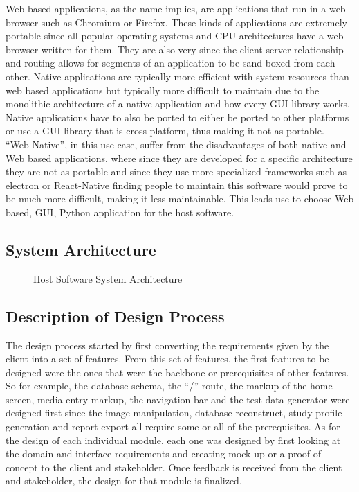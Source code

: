 \documentclass[12pt]{article}
\begin{document}
Web based applications, as the name implies, are applications that run in a web browser such as Chromium or Firefox. These kinds of applications are extremely portable since all popular operating systems and CPU architectures have a web browser written for them. They are also very since the client-server relationship and routing allows for segments of an application to be sand-boxed from each other. Native applications are typically more efficient with system resources than web based applications but typically more difficult to maintain due to the monolithic architecture of a native application and how every GUI library works. Native applications have to also be ported to either be ported to other platforms or use a GUI library that is cross platform, thus making it not as portable. ``Web-Native'', in this use case, suffer from the disadvantages of both native and Web based applications, where since they are developed for a specific architecture they are not as portable and since they use more specialized frameworks such as electron or React-Native finding people to maintain this software would prove to be much more difficult, making it less maintainable. This leads use to choose Web based, GUI, Python application for the host software.\\
\subsection{System Architecture}
\begin{figure}[H]
	\caption{Host Software System Architecture}
\end{figure}
\subsection{Description of Design Process}
The design process started by first converting the requirements given by the client into a set of features. From this set of features, the first features to be designed were the ones that were the backbone or prerequisites of other features. So for example, the database schema, the ``/'' route, the markup of the home screen, media entry markup, the navigation bar and the test data generator were designed first since the image manipulation, database reconstruct, study profile generation and report export all require some or all of the prerequisites. As for the design of each individual module, each one was designed by first looking at the domain and interface requirements and creating mock up or a proof of concept to the client and stakeholder. Once feedback is received from the client and stakeholder, the design for that module is finalized.
\end{document}
